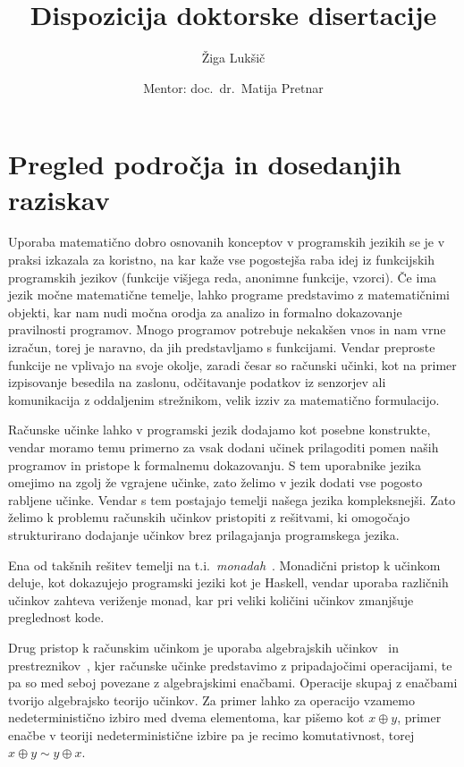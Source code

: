 \documentclass{article}
\title{Dispozicija doktorske disertacije}
\author{Žiga Lukšič \and Mentor: doc.\ dr.\ Matija Pretnar}
\date{}
\newcommand{\todo}[1]{{\color{red}{#1}}}
\begin{document}
\maketitle

\vspace{-10mm}
\begin{center}
  \Large{\textsc{\textbf{\todo{???}}}}

  \Large{\textsc{\textbf{\todo{??? but in english}}}}
\end{center}

\section*{Pregled področja in dosedanjih raziskav}

Uporaba matematično dobro osnovanih konceptov v programskih jezikih se je v praksi izkazala za koristno, na kar kaže vse pogostejša raba idej iz funkcijskih programskih jezikov (funkcije višjega reda, anonimne funkcije, vzorci). Če ima jezik močne matematične temelje, lahko programe predstavimo z matematičnimi objekti, kar nam nudi močna orodja za analizo in formalno dokazovanje pravilnosti programov. Mnogo programov potrebuje nekakšen vnos in nam vrne izračun, torej je naravno, da jih predstavljamo s funkcijami. Vendar preproste funkcije ne vplivajo na svoje okolje, zaradi česar so računski učinki, kot na primer izpisovanje besedila na zaslonu, odčitavanje podatkov iz senzorjev ali komunikacija z oddaljenim strežnikom, velik izziv za matematično formulacijo.

Računske učinke lahko v programski jezik dodajamo kot posebne konstrukte, vendar moramo temu primerno za vsak dodani učinek prilagoditi pomen naših programov in pristope k formalnemu dokazovanju. S tem uporabnike jezika omejimo na zgolj že vgrajene učinke, zato želimo v jezik dodati vse pogosto rabljene učinke. Vendar s tem postajajo temelji našega jezika kompleksnejši. Zato želimo k problemu računskih učinkov pristopiti z rešitvami, ki omogočajo strukturirano dodajanje učinkov brez prilagajanja programskega jezika.

Ena od takšnih rešitev temelji na t.i.\ \emph{monadah}~\cite{DBLP:journals/iandc/Moggi91}. Monadični pristop k učinkom deluje, kot dokazujejo programski jeziki kot je Haskell, vendar uporaba različnih učinkov zahteva veriženje monad, kar pri veliki količini učinkov zmanj\-šuje preglednost kode.

Drug pristop k računskim učinkom je uporaba algebrajskih učinkov~\cite{DBLP:conf/fossacs/PlotkinP01, DBLP:journals/acs/PlotkinP03} in prestreznikov~\cite{DBLP:conf/esop/PlotkinP09}, kjer računske učinke predstavimo z pripadajočimi operacijami, te pa so med seboj povezane z algebrajskimi enačbami. Operacije skupaj z enačbami tvorijo algebrajsko teorijo učinkov. Za primer lahko za operacijo vzamemo nedeterministično izbiro med dvema elementoma, kar pišemo kot $x \oplus y$, primer enačbe v teoriji nedeterministične izbire pa je recimo komutativnost, torej $x \oplus y \sim y \oplus x$.
\end{document}
